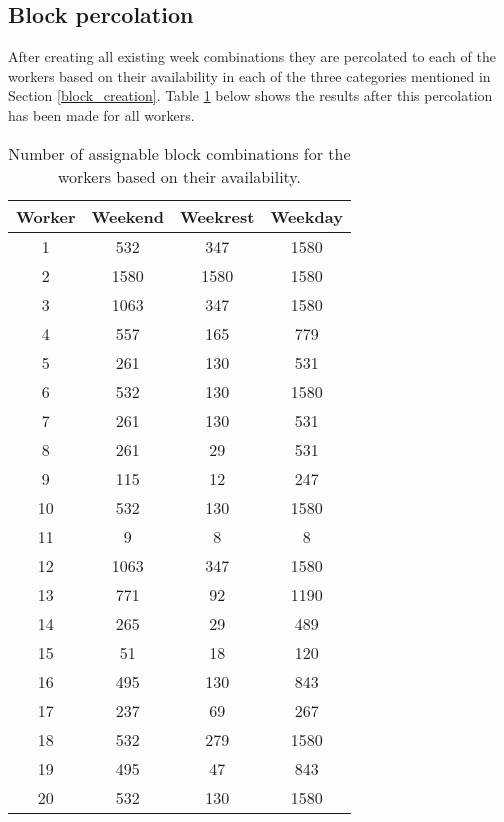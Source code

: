 \subsection{Block percolation}
After creating all existing week combinations they are percolated to each of the workers based on their availability in each of the three categories mentioned in Section \ref{block_creation}. Table \ref{blocks_available_per_worker} below shows the results after this percolation has been made for all workers.

\begin{table}[!h]
\centering
\caption{Number of assignable block combinations for the workers based on their availability.}
\label{blocks_available_per_worker}
\begin{tabular}{|c|ccc|}
\hline
Worker & Weekend & Weekrest & Weekday \\ \hline
1      & 532     & 347      & 1580    \\ \hline
2      & 1580    & 1580     & 1580    \\ \hline
3      & 1063    & 347      & 1580    \\ \hline
4      & 557     & 165      & 779     \\ \hline
5      & 261     & 130      & 531     \\ \hline
6      & 532     & 130      & 1580    \\ \hline
7      & 261     & 130      & 531     \\ \hline
8      & 261     & 29       & 531     \\ \hline
9      & 115     & 12       & 247     \\ \hline
10     & 532     & 130      & 1580    \\ \hline
11     & 9       & 8        & 8       \\ \hline
12     & 1063    & 347      & 1580    \\ \hline
13     & 771     & 92       & 1190    \\ \hline
14     & 265     & 29       & 489     \\ \hline
15     & 51      & 18       & 120     \\ \hline
16     & 495     & 130      & 843     \\ \hline
17     & 237     & 69       & 267     \\ \hline
18     & 532     & 279      & 1580    \\ \hline
19     & 495     & 47       & 843     \\ \hline
20     & 532     & 130      & 1580    \\ \hline

\end{tabular}
\end{table}
